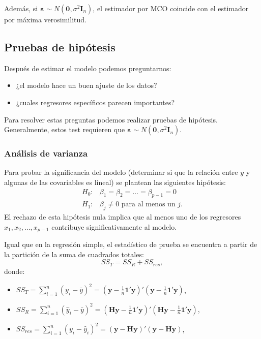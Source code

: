 \documentclass[
]{article}
\providecommand{\tightlist}{%
  \setlength{\itemsep}{0pt}\setlength{\parskip}{0pt}}
\begin{document}
Además, si \(\boldsymbol \varepsilon\sim N(\boldsymbol 0, \sigma^{2}\boldsymbol I_{n})\), el estimador por MCO coincide con el estimador por máxima verosimilitud.

\hypertarget{pruebas-de-hipuxf3tesis-1}{%
\subsection{Pruebas de hipótesis}\label{pruebas-de-hipuxf3tesis-1}}

Después de estimar el modelo podemos preguntarnos:

\begin{itemize}
\tightlist
\item
  ¿el modelo hace un buen ajuste de los datos?
\item
  ¿cuales regresores específicos parecen importantes?
\end{itemize}

Para resolver estas preguntas podemos realizar pruebas de hipótesis. Generalmente, estos test requieren que \(\boldsymbol \varepsilon\sim N(\boldsymbol 0,\sigma^{2}\boldsymbol I_{n})\).

\hypertarget{anuxe1lisis-de-varianza-1}{%
\subsubsection{Análisis de varianza}\label{anuxe1lisis-de-varianza-1}}

Para probar la significancia del modelo (determinar si que la relación entre \(y\) y algunas de las covariables es lineal) se plantean las siguientes hipótesis:
\begin{equation}
\begin{split}
H_{0}:& \beta_{1}=\beta_{2}=\ldots=\beta_{p-1} = 0 \\
H_{1}:& \beta_{j}\neq 0 \mbox{ para al menos un }j.
\end{split}
\label{eq:HANOVA}
\end{equation}
El rechazo de esta hipótesis nula implica que al menos uno de los regresores \(x_1, x_2,\ldots , x_{p-1}\) contribuye significativamente al modelo.

Igual que en la regresión simple, el estadístico de prueba se encuentra a partir de la partición de la suma de cuadrados totales:
\[
SS_{T}  = SS_{R} + SS_{res},
\]
donde:

\begin{itemize}
\tightlist
\item
  \(SS_{T} = \sum_{i=1}^{n}(y_{i}-\bar{y})^{2} = (\boldsymbol y- \frac{1}{n}\boldsymbol 1'\boldsymbol y)'(\boldsymbol y- \frac{1}{n}\boldsymbol 1'\boldsymbol y)\),
\item
  \(SS_{R} = \sum_{i=1}^{n}(\widehat{y}_{i}-\bar{y})^{2} = (\boldsymbol H\boldsymbol y- \frac{1}{n}\boldsymbol 1'\boldsymbol y)'(\boldsymbol H\boldsymbol y- \frac{1}{n}\boldsymbol 1'\boldsymbol y)\),
\item
  \(SS_{res} = \sum_{i=1}^{n}(y_{i}-\widehat{y}_{i})^{2} = (\boldsymbol y- \boldsymbol H\boldsymbol y)'(\boldsymbol y- \boldsymbol H\boldsymbol y)\),
\end{itemize}
\end{document}
